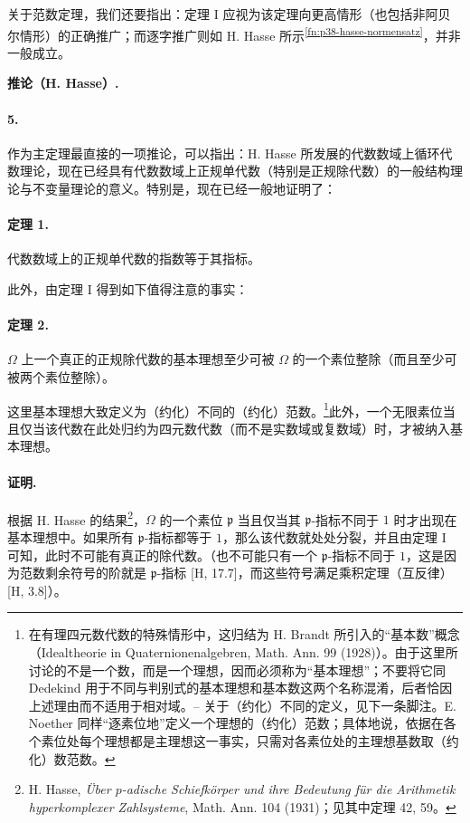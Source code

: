 \documentclass[11pt]{article}
\providecommand{\glqq}{“}
\providecommand{\grqq}{”}
\begin{document}
关于范数定理，我们还要指出：定理 I 应视为该定理向更高情形（也包括非阿贝尔情形）的正确推广；而逐字推广则如 H. Hasse 所示\textsuperscript{\ref{fn:p38-hasse-normensatz}}，并非一般成立。

\begin{center}
\textbf{推论（H. Hasse）.}
\end{center}

\paragraph{5.}
作为主定理最直接的一项推论，可以指出：H. Hasse 所发展的代数数域上循环代数理论，现在已经具有代数数域上正规单代数（特别是正规除代数）的一般结构理论与不变量理论的意义。特别是，现在已经一般地证明了：

\paragraph{定理 1.}
代数数域上的正规单代数的指数等于其指标。

此外，由定理 I 得到如下值得注意的事实：

\paragraph{定理 2.}
\(\Omega\) 上一个真正的正规除代数的基本理想至少可被 \(\Omega\) 的一个素位整除（而且至少可被两个素位整除）。

这里基本理想大致定义为（约化）不同的（约化）范数。\footnote{在有理四元数代数的特殊情形中，这归结为 H. Brandt 所引入的\glqq{}基本数\grqq{}概念（Idealtheorie in Quaternionenalgebren, Math. Ann. 99 (1928)）。由于这里所讨论的不是一个数，而是一个理想，因而必须称为\glqq{}基本理想\grqq{}；不要将它同 Dedekind 用于不同与判别式的基本理想和基本数这两个名称混淆，后者恰因上述理由而不适用于相对域。-- 关于（约化）不同的定义，见下一条脚注。E. Noether 同样\glqq{}逐素位地\grqq{}定义一个理想的（约化）范数；具体地说，依据在各个素位处每个理想都是主理想这一事实，只需对各素位处的主理想基数取（约化）数范数。}此外，一个无限素位当且仅当该代数在此处归约为四元数代数（而不是实数域或复数域）时，才被纳入基本理想。

\paragraph{证明.}
根据 H. Hasse 的结果\footnote{\label{fn:p38-hasse-padisch}H. Hasse, \emph{Über \(p\)-adische Schiefkörper und ihre Bedeutung für die Arithmetik hyperkomplexer Zahlsysteme}, Math. Ann. 104 (1931)；见其中定理 42, 59。}，\(\Omega\) 的一个素位 \(\mathfrak p\) 当且仅当其 \(\mathfrak p\)-指标不同于 \(1\) 时才出现在基本理想中。如果所有 \(\mathfrak p\)-指标都等于 \(1\)，那么该代数就处处分裂，并且由定理 I 可知，此时不可能有真正的除代数。（也不可能只有一个 \(\mathfrak p\)-指标不同于 \(1\)，这是因为范数剩余符号的阶就是 \(\mathfrak p\)-指标 [H, 17.7]，而这些符号满足乘积定理（互反律）[H, 3.8]）。
\end{document}
